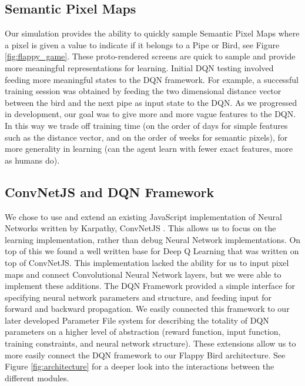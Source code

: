 \documentclass{chi2009}
\begin{document}
\subsection{Semantic Pixel Maps}

Our simulation provides the ability to quickly sample Semantic Pixel Maps where a pixel is given a value to indicate if it belongs to a Pipe or Bird, see Figure \ref{fig:flappy_game}. These proto-rendered screens are quick to sample and provide more meaningful representations for learning. Initial DQN testing involved feeding more meaningful states to the DQN framework. For example, a successful training session was obtained by feeding the two dimensional distance vector between the bird and the next pipe as input state to the DQN. As we progressed in development, our goal was to give more and more vague features to the DQN. In this way we trade off training time (on the order of days for simple features such as the distance vector, and on the order of weeks for semantic pixels), for more generality in learning (can the agent learn with fewer exact features, more as humans do).

\subsection{ConvNetJS and DQN Framework}

We chose to use and extend an existing JavaScript implementation of Neural Networks written by Karpathy, ConvNetJS \cite{karpathygoogle}. This allows us to focus on the learning implementation, rather than debug Neural Network implementations. On top of this we found a well written base for Deep Q Learning that was written on top of ConvNetJS. This implementation lacked the ability for us to input pixel maps and connect Convolutional Neural Network layers, but we were able to implement these additions. The DQN Framework provided a simple interface for specifying neural network parameters and structure, and feeding input for forward and backward propagation. We easily connected this framework to our later developed Parameter File system for describing the totality of DQN parameters on a higher level of abstraction (reward function, input function, training constraints, and neural network structure). These extensions allow us to more easily connect the DQN framework to our Flappy Bird architecture. See Figure \ref{fig:architecture} for a deeper look into the interactions between the different modules.
\end{document}
